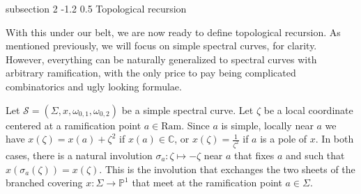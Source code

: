 \documentclass[reqno,oneside,11pt]{amsart}
\makeatletter
\theoremstyle{plain}
\theoremstyle{definition}
\newtheorem{definition}[theorem]{Definition}
\theoremstyle{remark}
\newtheorem{remark}[theorem]{Remark}
\numberwithin{equation}{section}
\renewcommand{\subsection}{\@startsection
{subsection}%
{2}%
{\z@}%
{-1.2\baselineskip}%
{0.5\baselineskip}%
{\normalfont \bf \normalsize}} %
\DeclareMathOperator*{\Res}{Res}
\newcommand{\Ra}{\text{Ram}}
\makeatother
\begin{document}
%
%

\subsection{Topological recursion}

With this under our belt, we are now ready to define topological recursion. As mentioned previously, we will focus on simple spectral curves, for clarity. However, everything can be naturally generalized to spectral curves with arbitrary ramification, with the only price to pay being complicated combinatorics and ugly looking formulae.

Let $\mathcal{S} = (\Sigma,x,\omega_{0,1}, \omega_{0,2})$ be a simple spectral curve. Let $\zeta$ be a local coordinate centered at a ramification point $a \in \Ra$. Since $a$ is simple, locally near $a$ we have $x(\zeta) = x(a) + \zeta^2$ if $x(a) \in \mathbb{C}$, or $x(\zeta) = \frac{1}{\zeta^2}$ if $a$ is a pole of $x$. In both cases, there is a natural involution $\sigma_a: \zeta \mapsto - \zeta$ near $a$ that fixes $a$ and such that $x(\sigma_a(\zeta)) = x(\zeta)$. This is the involution that exchanges the two sheets of the branched covering $x: \Sigma \to \mathbb{P}^1$ that meet at the ramification point $a \in \Sigma$.
\end{document}
